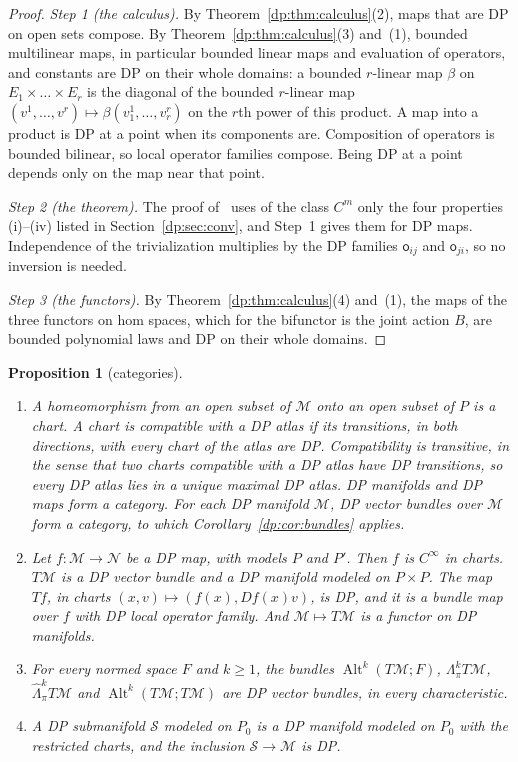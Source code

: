 \documentclass[11pt]{amsart}
\newtheorem{proposition}[theorem]{Proposition}
\theoremstyle{definition}
\theoremstyle{remark}
\numberwithin{equation}{section}
\newcommand{\Alt}{\operatorname{Alt}}
\theoremstyle{plain}
\theoremstyle{definition}
\theoremstyle{plain}
\newcommand{\cS}{\mathcal S}
\begin{document}
\begin{proof}
\emph{Step 1 (the calculus).} By Theorem~\ref{dp:thm:calculus}(2), maps that are DP on open sets compose. By Theorem~\ref{dp:thm:calculus}(3) and~(1), bounded multilinear maps, in particular bounded linear maps and evaluation of operators, and constants are DP on their whole domains: a bounded $r$\nobreakdash-linear map $\beta$ on $E_1\times\dots\times E_r$ is the diagonal of the bounded $r$\nobreakdash-linear map $(v^1,\dots,v^r)\mapsto\beta(v^1_1,\dots,v^r_r)$ on the $r$th power of this product. A map into a product is DP at a point when its components are. Composition of operators is bounded bilinear, so local operator families compose. Being DP at a point depends only on the map near that point.

\emph{Step 2 (the theorem).} The proof of~\cite[Theorem~2.1]{I} uses of the class $C^m$ only the four properties (i)--(iv) listed in Section~\ref{dp:sec:conv}, and Step~1 gives them for DP maps. Independence of the trivialization multiplies by the DP families $\mathsf o_{ij}$ and $\mathsf o_{ji}$, so no inversion is needed.

\emph{Step 3 (the functors).} By Theorem~\ref{dp:thm:calculus}(4) and~(1), the maps of the three functors on hom spaces, which for the bifunctor is the joint action $B$, are bounded polynomial laws and DP on their whole domains.
\end{proof}

\begin{proposition}[categories]\label{dp:prop:categories}
\leavevmode
\begin{enumerate}
\item A homeomorphism from an open subset of $\mathcal M$ onto an open subset of $P$ is a \emph{chart}. A chart is \emph{compatible} with a DP atlas if its transitions, in both directions, with every chart of the atlas are DP. Compatibility is transitive, in the sense that two charts compatible with a DP atlas have DP transitions, so every DP atlas lies in a unique maximal DP atlas. DP manifolds and DP maps form a category. For each DP manifold $\mathcal M$, DP vector bundles over $\mathcal M$ form a category, to which Corollary~\ref{dp:cor:bundles} applies.
\item Let $f\colon\mathcal M\to\mathcal N$ be a DP map, with models $P$ and $P'$. Then $f$ is $C^\infty$ in charts. $T\mathcal M$ is a DP vector bundle and a DP manifold modeled on $P\times P$. The map $Tf$, in charts $(x,v)\mapsto(f(x),Df(x)v)$, is DP, and it is a bundle map over $f$ with DP local operator family. And $\mathcal M\mapsto T\mathcal M$ is a functor on DP manifolds.
\item For every normed space $F$ and $k\ge1$, the bundles $\Alt^k(T\mathcal M;F)$, $\Lambda^k_\pi T\mathcal M$, $\widehat\Lambda^k_\pi T\mathcal M$ and $\Alt^k(T\mathcal M;T\mathcal M)$ are DP vector bundles, in every characteristic.
\item A DP submanifold $\cS$ modeled on $P_0$ is a DP manifold modeled on $P_0$ with the restricted charts, and the inclusion $\cS\to\mathcal M$ is DP.
\end{enumerate}
\end{proposition}
\end{document}
